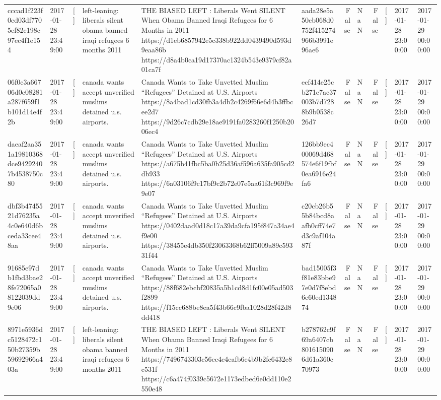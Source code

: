 \begin{tabular}{llllllrlrlll}
cccad1f223f0ed03df7705ef82e198c97ec4f1e154 & 2017-01-28 23:49:00 & [] & left-leaning: liberals silent obama banned iraqi refugees 6 months 2011 & THE BIASED LEFT : Liberals Went SILENT When Obama Banned Iraqi Refugees for 6 Months in 2011 https://d1eb6857942e5c338b922dd0439490d593d9eaa86b https://d8a4b0ca19d17370ac1324b543e9379cf82a01ca7f & aada28e5a50cb068d0752f415274966b3991e96ae6 & False & NaN & False & [] & 2017-01-28 23:00:00 & 2017-01-29 00:00:00 \\
06f0c3a66706d0e08281a287f659f1b101d14e4f2b & 2017-01-28 23:49:00 & [] & canada wants accept unverified muslims detained u.s. airports. & Canada Wants to Take Unvetted Muslim “Refugees” Detained at U.S. Airports https://8a4bad1cd30fb3a4db2c4269f66e6d4b3ffbcee2d7 https://9d26c7cdb29e18ae9191fa0283260f1250b2006ec4 & ecf414e25cb271e7ac37003b7d7288b9b0538c26d7 & False & NaN & False & [] & 2017-01-28 23:00:00 & 2017-01-29 00:00:00 \\
daeaf2aa351a19810368dce94292407b4538750c80 & 2017-01-28 23:49:00 & [] & canada wants accept unverified muslims detained u.s. airports. & Canada Wants to Take Unvetted Muslim “Refugees” Detained at U.S. Airports https://a675b41fbc5ba0b25d36af596a635fa905cd2db933 https://6a03106f9c17bf9c2b72e07e5aa61f3c969f9e9e07 & 126bb9ec400069d468574e6f19fbf0ea6916e24fa6 & False & NaN & False & [] & 2017-01-28 23:00:00 & 2017-01-29 00:00:00 \\
dbf3b4745521d76235a4c0e640d6bceda33cee48aa & 2017-01-28 23:49:00 & [] & canada wants accept unverified muslims detained u.s. airports. & Canada Wants to Take Unvetted Muslim “Refugees” Detained at U.S. Airports https://0402daad0d18c17a39da9cfa195f847a34ae4f9e00 https://38455e4db350f23063368b62ff5009a89c59331f44 & c20cb26b55b84bcd8aafb0cff74e7d3c9af104a87f & False & NaN & False & [] & 2017-01-28 23:00:00 & 2017-01-29 00:00:00 \\
91685e97db1fbd3bae28fe72065a08122039dd9e06 & 2017-01-28 23:49:00 & [] & canada wants accept unverified muslims detained u.s. airports. & Canada Wants to Take Unvetted Muslim “Refugees” Detained at U.S. Airports https://88f682ebcbf20835a5b1cd8d1fc00e05ad503f2899 https://f15cc688be8ea5f43b66c9fba1028d28f42d8dd418 & bad15005f3f81e83bbe97e0d7f8ebd6e60ed134874 & False & NaN & False & [] & 2017-01-28 23:00:00 & 2017-01-29 00:00:00 \\
8971e5936dc5128472c150b27359b59692966a403a & 2017-01-28 23:49:00 & [] & left-leaning: liberals silent obama banned iraqi refugees 6 months 2011 & THE BIASED LEFT : Liberals Went SILENT When Obama Banned Iraqi Refugees for 6 Months in 2011 https://7496743303c56ec4e4eafb6e4b9b2fc6432e8c531f https://c6a474f0339c5672e1173edbed6e0dd110e2550e48 & b278762c9f69a6407cb8016150906d61a360c70973 & False & NaN & False & [] & 2017-01-28 23:00:00 & 2017-01-29 00:00:00 \\

\end{tabular}
